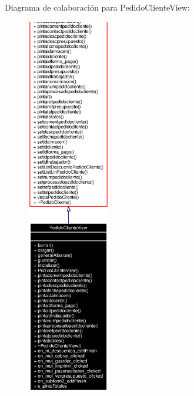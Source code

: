 Diagrama de colaboraci\'{o}n para Pedido\-Cliente\-View:\begin{figure}[H]
\begin{center}
\leavevmode
\includegraphics[width=103pt]{classPedidoClienteView__coll__graph}
\end{center}
\end{figure}
